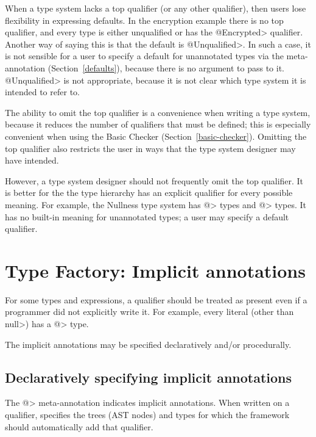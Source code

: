 When a type system lacks a top qualifier (or any other qualifier), then
users lose flexibility in expressing defaults.  In the encryption example
there is no top qualifier, and every type is either unqualified or has the
\<@Encrypted> qualifier.  Another way of saying this is that the default is
\<@Unqualified>.  In such a case, it is not sensible for a user to specify
a default for unannotated types via the
 meta-annotation
(Section~\ref{defaults}), because there is no argument to pass to it.
\<@Unqualified> is not appropriate, because it is not clear which type
system it is intended to refer to.

The ability to omit the top qualifier is a convenience
when writing a type system, because it reduces the number of qualifiers
that must be defined; this is especially convenient when using the Basic
Checker (Section~\ref{basic-checker}).
Omitting the top qualifier also restricts the user in ways that the type
system designer may have intended.

However, a type system designer should not frequently omit the top qualifier.
It is better for the 
the type hierarchy has an explicit qualifier for every
possible meaning.  For example, the Nullness type system has
\<@> types and
\<@> types.  It has no built-in meaning for
unannotated types; a user may specify a default qualifier.


\section{Type Factory: Implicit annotations\label{writing-type-introduction}}

For some types and expressions, a qualifier should be treated as present
even if a programmer did not explicitly write it.  For example, every
literal (other than \<null>) has a \<@> type.

The implicit annotations may be specified declaratively and/or procedurally.


\subsection{Declaratively specifying implicit annotations\label{declarative-type-introduction}}

The \<@> meta-annotation indicates implicit annotations.
When written on a qualifier, 
specifies the trees (AST nodes) and types for which the framework should
automatically add that qualifier.


